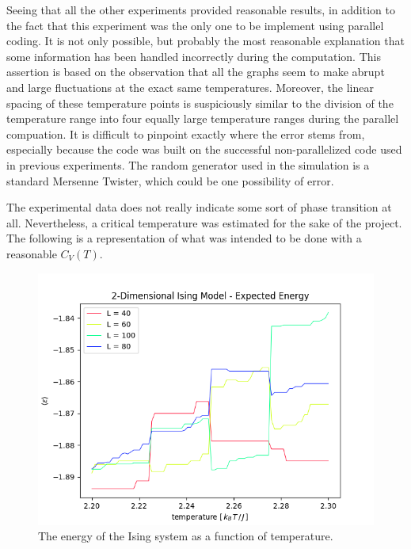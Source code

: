 \documentclass[nofootinbib,reprint,english]{revtex4-1}
\begin{document}
Seeing that all the other experiments provided reasonable results, in addition to the fact that this experiment was the only one to be implement using parallel coding. It is not only possible, but probably the most reasonable explanation that some information has been handled incorrectly during the computation. This assertion is based on the observation that all the graphs seem to make abrupt and large fluctuations at the exact same temperatures. Moreover, the linear spacing of these temperature points is suspiciously similar to the division of the temperature range into four equally large temperature ranges during the parallel compuation. It is difficult to pinpoint exactly where the error stems from, especially because the code was built on the successful non-parallelized code used in previous experiments. The random generator used in the simulation is a standard Mersenne Twister, which could be one possibility of error.

The experimental data does not really indicate some sort of phase transition at all. Nevertheless, a critical temperature was estimated for the sake of the project. The following is a representation of what was intended to be done with a reasonable \(C_V(T)\).

\begin{figure}[h!]
\centering
\includegraphics[scale=0.5]{../output/figures/experiment4/energy_full.png}
\caption{The energy of the Ising system as a function of temperature.}\label{fig:experiment4_energy_full}
\end{figure}
\end{document}
